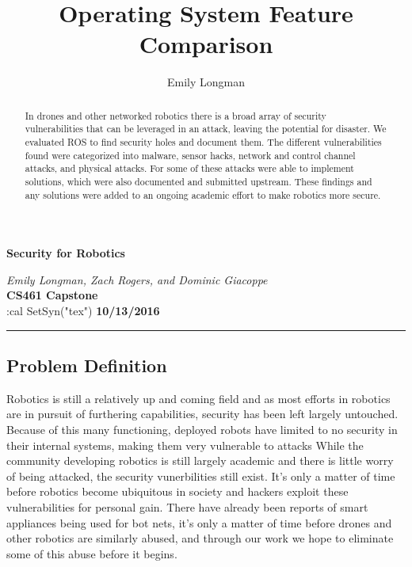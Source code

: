 \documentclass[IEEEtran,letterpaper,10pt,titlepage,draftclsnofoot,onecolumn]{article}
\title{Operating System Feature Comparison}
\author{Emily Longman}
\begin{document}
\begin{titlepage}
  \begin{center}
    \vspace*{1cm}
    
    \huge
    \textbf{Security for Robotics}      
  \vspace{0.5cm}
        
    \textit{Emily Longman, Zach Rogers, and Dominic Giacoppe}\\ 
  \vspace{0.5cm}
    \vfill
    \large
    \textbf{CS461 Capstone}\\ 
  \vspace{5mm}
:cal SetSyn("tex")
    \textbf{10/13/2016}\\ 
    
    \vfill
    \end{center}
\end{titlepage}

\begin{abstract}
  In drones and other networked robotics there is a broad array of security vulnerabilities that can be leveraged in an attack, leaving the potential for disaster. 
  We evaluated ROS to find security holes and document them. 
  The different vulnerabilities found were categorized into malware, sensor hacks, network and control channel attacks, and physical attacks. 
  For some of these attacks were able to implement solutions, which were also documented and submitted upstream.
  These findings and any solutions were added to an ongoing academic effort to make robotics more secure.
\end{abstract}

\hrule\vspace{5mm}
\subsection*{Problem Definition}
Robotics is still a relatively up and coming field and as most efforts in robotics are in 
pursuit of furthering capabilities, security has been left largely untouched. 
Because of this many functioning, deployed robots have limited to no security in their internal systems, making them very vulnerable to attacks
While the community developing robotics is still largely academic and there is little worry of being attacked, the security vunerbilities still exist. 
It's only a matter of time before robotics become ubiquitous in society and hackers exploit these vulnerabilities for personal gain.
There have already been reports of smart appliances being used for bot nets, it's only a matter of time before drones and other robotics are similarly abused, and through our work we hope to
eliminate some of this abuse before it begins.
\end{document}
